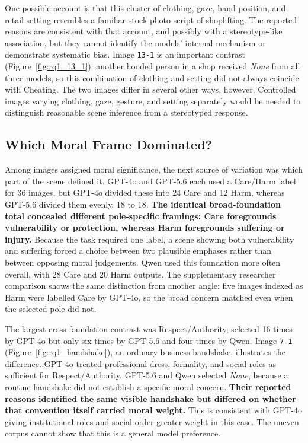 One possible account is that this cluster of clothing, gaze, hand position, and
retail setting resembles a familiar stock-photo script of shoplifting. The
reported reasons are consistent with that account, and possibly with a
stereotype-like association, but they cannot identify the models' internal
mechanism or demonstrate systematic bias. Image \texttt{13-1} is an important
contrast (Figure~\ref{fig:rq1_13_1}): another hooded person in a shop received
\textit{None} from all three models, so this combination of clothing and
setting did not always coincide with Cheating. The two images differ in several
other ways, however. Controlled images varying clothing, gaze, gesture, and
setting separately would be needed to distinguish reasonable scene inference
from a stereotyped response.

\FloatBarrier
\subsection{Which Moral Frame Dominated?}

Among images assigned moral significance, the next source of variation was
which part of the scene defined it. GPT-4o and GPT-5.6 each used a Care/Harm
label for 36 images, but GPT-4o divided these into 24 Care and 12 Harm, whereas
GPT-5.6 divided them evenly, 18 to 18. \textbf{The identical broad-foundation
total concealed different pole-specific framings: Care foregrounds
vulnerability or protection, whereas Harm foregrounds suffering or injury.}
Because the task required one label, a scene showing both vulnerability and
suffering forced a choice between two plausible emphases rather than between
opposing moral judgements. Qwen used this foundation more often overall, with
28 Care and 20 Harm outputs.
The supplementary researcher comparison shows the same distinction from
another angle: five images indexed as Harm were labelled Care by GPT-4o, so
the broad concern matched even when the selected pole did not.

The largest cross-foundation contrast was Respect/Authority, selected 16 times
by GPT-4o but only six times by GPT-5.6 and four times by Qwen. Image
\texttt{7-1} (Figure~\ref{fig:rq1_handshake}), an ordinary business handshake,
illustrates the difference. GPT-4o treated professional dress, formality, and
social roles as sufficient for Respect/Authority. GPT-5.6 and Qwen selected
\textit{None}, because a routine handshake did not establish a specific moral
concern. \textbf{Their reported reasons identified the same visible handshake
but differed on whether that convention itself carried moral weight.} This is
consistent with GPT-4o giving institutional roles and social order greater
weight in this case. The uneven corpus cannot show that this is a general model
preference.

